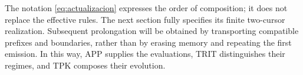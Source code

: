 The notation \eqref{eq:actualizacion} expresses the order of composition; it does not replace the effective rules. The next section fully specifies its finite two-cursor realization. Subsequent prolongation will be obtained by transporting compatible prefixes and boundaries, rather than by erasing memory and repeating the first emission. In this way, APP supplies the evaluations, TRIT distinguishes their regimes, and TPK composes their evolution.




